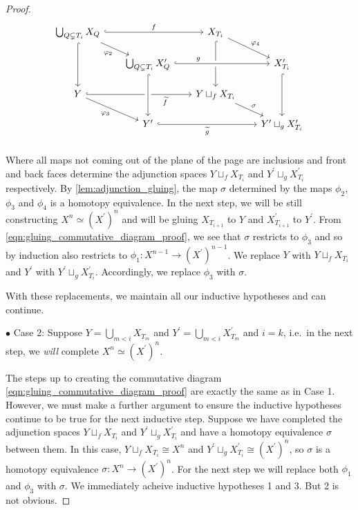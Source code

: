 \documentclass[class=article, crop=false]{standalone}
\begin{document}
\begin{proof}
    \begin{equation}
        \begin{tikzcd}[row sep=scriptsize, column sep=scriptsize]
            \bigcup_{Q \subsetneq T_i} X_{Q} \ar[dr, "\phi_2"'] \ar[rr, hookrightarrow, "f"] \ar[dd, hookrightarrow]     &  &   X_{T_i} \ar[dr, "\phi_4"] \ar[dd, hookrightarrow]  &  \\
            &   \bigcup_{Q \subsetneq T_i} X^\prime_{Q} \ar[rr, crossing over, hookrightarrow, "g" near start] & &  X^\prime_{T_i}\ar[dd, hookrightarrow]                         \\
            Y \ar[dr, "\phi_3"'] \ar[rr, hookrightarrow, "\widetilde{f}"', near end]  & &   Y \sqcup_f X_{T_i} \ar[dr, "\sigma"] &                                              \\
            &   Y^\prime \ar[rr, hookrightarrow, "\widetilde{g}"']  \ar[from=uu, crossing over, hookrightarrow]    &    &   Y^\prime\sqcup_g X^\prime_{T_i}                     \\
        \end{tikzcd}
    \label{eqn:gluing_commutative_diagram_proof}
    \end{equation}
    Where all maps not coming out of the plane of the page are inclusions and front and back faces determine the adjunction spaces $ Y \sqcup_f X_{T_i}$ and $Y^\prime\sqcup_g X^\prime_{T_i}$ respectively. By \cref{lem:adjunction_gluing}, the map $\sigma$ determined by the maps $\phi_2$, $\phi_3$ and $\phi_4$ is a homotopy equivalence.
    In the next step, we will be still constructing $X^n \simeq (X^\prime)^n$ and will be gluing $X_{T_{i+1}}$ to $Y$ and $X^\prime_{T_{i+1}}$ to $Y^\prime$. From \eqref{eqn:gluing_commutative_diagram_proof}, we see that $\sigma$ restricts to $\phi_3$ and so by induction also restricts to $\phi_1 \colon X^{n-1} \to (X^\prime)^{n-1}$. We replace $Y$ with $ Y \sqcup_f X_{T_i}$ and $Y^\prime$ with $Y^\prime\sqcup_g X^\prime_{T_i}$. Accordingly, we replace $\phi_3$ with $\sigma$. 

    With these replacements, we maintain all our inductive hypotheses and can continue.

    $\bullet$ Case 2: Suppose $Y = \bigcup_{m < i} X_{T_m}$ and $Y^\prime = \bigcup_{m < i} X^\prime_{T_m}$ and $i = k$, i.e.~in the next step, we \emph{will} complete $X^n \simeq (X^\prime)^n$.

    The steps up to creating the commutative diagram \eqref{eqn:gluing_commutative_diagram_proof} are exactly the same as in Case 1. However, we must make a further argument to ensure the inductive hypotheses continue to be true for the next inductive step. Suppose we have completed the adjunction spaces $ Y \sqcup_f X_{T_i}$ and $Y^\prime\sqcup_g X^\prime_{T_i}$ and have a homotopy equivalence $\sigma$ between them. In this case, $ Y \sqcup_f X_{T_i} \cong X^n$ and $Y^\prime\sqcup_g X^\prime_{T_i} \cong (X^\prime)^{n}$, so $\sigma$ is a homotopy equivalence $\sigma \colon X^n \to (X^\prime)^n$. For the next step we will replace both $\phi_1$ and $\phi_3$ with $\sigma$. We immediately acheive inductive hypotheses 1 and 3. But 2 is not obvious.
    

\end{proof}
\end{document}

